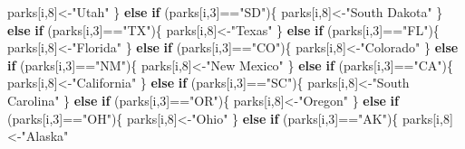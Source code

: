 \documentclass[
]{article}
\newenvironment{Shaded}{\begin{snugshade}}{\end{snugshade}}
\newcommand{\ControlFlowTok}[1]{\textcolor[rgb]{0.13,0.29,0.53}{\textbf{#1}}}
\newcommand{\DecValTok}[1]{\textcolor[rgb]{0.00,0.00,0.81}{#1}}
\newcommand{\NormalTok}[1]{#1}
\newcommand{\OtherTok}[1]{\textcolor[rgb]{0.56,0.35,0.01}{#1}}
\newcommand{\SpecialCharTok}[1]{\textcolor[rgb]{0.00,0.00,0.00}{#1}}
\newcommand{\StringTok}[1]{\textcolor[rgb]{0.31,0.60,0.02}{#1}}
\begin{document}
\begin{Shaded}
\begin{Highlighting}[]
\NormalTok{    parks[i,}\DecValTok{8}\NormalTok{]}\OtherTok{\textless{}{-}}\StringTok{"Utah"}
\NormalTok{  \}}
  \ControlFlowTok{else} \ControlFlowTok{if}\NormalTok{ (parks[i,}\DecValTok{3}\NormalTok{]}\SpecialCharTok{==}\StringTok{"SD"}\NormalTok{)\{}
\NormalTok{    parks[i,}\DecValTok{8}\NormalTok{]}\OtherTok{\textless{}{-}}\StringTok{"South Dakota"}
\NormalTok{  \}}
  \ControlFlowTok{else} \ControlFlowTok{if}\NormalTok{ (parks[i,}\DecValTok{3}\NormalTok{]}\SpecialCharTok{==}\StringTok{"TX"}\NormalTok{)\{}
\NormalTok{    parks[i,}\DecValTok{8}\NormalTok{]}\OtherTok{\textless{}{-}}\StringTok{"Texas"}
\NormalTok{  \}}
  \ControlFlowTok{else} \ControlFlowTok{if}\NormalTok{ (parks[i,}\DecValTok{3}\NormalTok{]}\SpecialCharTok{==}\StringTok{"FL"}\NormalTok{)\{}
\NormalTok{    parks[i,}\DecValTok{8}\NormalTok{]}\OtherTok{\textless{}{-}}\StringTok{"Florida"}
\NormalTok{  \}}
  \ControlFlowTok{else} \ControlFlowTok{if}\NormalTok{ (parks[i,}\DecValTok{3}\NormalTok{]}\SpecialCharTok{==}\StringTok{"CO"}\NormalTok{)\{}
\NormalTok{    parks[i,}\DecValTok{8}\NormalTok{]}\OtherTok{\textless{}{-}}\StringTok{"Colorado"}
\NormalTok{  \}}
  \ControlFlowTok{else} \ControlFlowTok{if}\NormalTok{ (parks[i,}\DecValTok{3}\NormalTok{]}\SpecialCharTok{==}\StringTok{"NM"}\NormalTok{)\{}
\NormalTok{    parks[i,}\DecValTok{8}\NormalTok{]}\OtherTok{\textless{}{-}}\StringTok{"New Mexico"}
\NormalTok{  \}}
  \ControlFlowTok{else} \ControlFlowTok{if}\NormalTok{ (parks[i,}\DecValTok{3}\NormalTok{]}\SpecialCharTok{==}\StringTok{"CA"}\NormalTok{)\{}
\NormalTok{    parks[i,}\DecValTok{8}\NormalTok{]}\OtherTok{\textless{}{-}}\StringTok{"California"}
\NormalTok{  \}}
  \ControlFlowTok{else} \ControlFlowTok{if}\NormalTok{ (parks[i,}\DecValTok{3}\NormalTok{]}\SpecialCharTok{==}\StringTok{"SC"}\NormalTok{)\{}
\NormalTok{    parks[i,}\DecValTok{8}\NormalTok{]}\OtherTok{\textless{}{-}}\StringTok{"South Carolina"}
\NormalTok{  \}}
  \ControlFlowTok{else} \ControlFlowTok{if}\NormalTok{ (parks[i,}\DecValTok{3}\NormalTok{]}\SpecialCharTok{==}\StringTok{"OR"}\NormalTok{)\{}
\NormalTok{    parks[i,}\DecValTok{8}\NormalTok{]}\OtherTok{\textless{}{-}}\StringTok{"Oregon"}
\NormalTok{  \}}
  \ControlFlowTok{else} \ControlFlowTok{if}\NormalTok{ (parks[i,}\DecValTok{3}\NormalTok{]}\SpecialCharTok{==}\StringTok{"OH"}\NormalTok{)\{}
\NormalTok{    parks[i,}\DecValTok{8}\NormalTok{]}\OtherTok{\textless{}{-}}\StringTok{"Ohio"}
\NormalTok{  \}}
  \ControlFlowTok{else} \ControlFlowTok{if}\NormalTok{ (parks[i,}\DecValTok{3}\NormalTok{]}\SpecialCharTok{==}\StringTok{"AK"}\NormalTok{)\{}
\NormalTok{    parks[i,}\DecValTok{8}\NormalTok{]}\OtherTok{\textless{}{-}}\StringTok{"Alaska"}

\end{Highlighting}
\end{Shaded}
\end{document}
